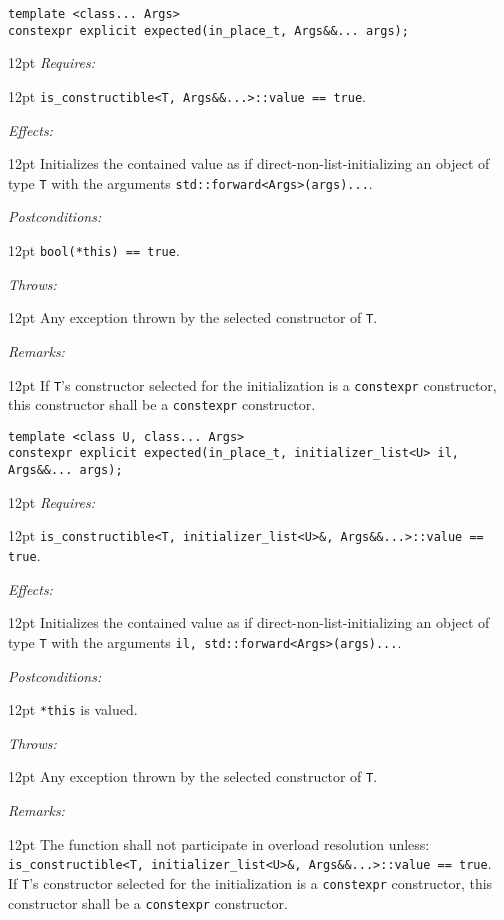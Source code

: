 \documentclass[a4paper,10pt]{article}
\newcommand{\cpp}[1]{\lstinline{#1}}
\newcommand{\wordingItem}[1]{\noindent\textit{#1:}}
\newenvironment{wordingTextItem}[1]{\wordingItem{#1}\vspace{7pt}\noindent\begin{adjustwidth}{12pt}{}}{\vspace{7pt}\end{adjustwidth}}
\newenvironment{wordingPara}{\begin{adjustwidth}{12pt}{}}{\end{adjustwidth}}
\begin{document}
\begin{lstlisting}[xleftmargin=0pt]
template <class... Args>
constexpr explicit expected(in_place_t, Args&&... args); 
\end{lstlisting}
\begin{wordingPara}
\begin{wordingTextItem}{Requires}
\cpp{is_constructible<T, Args&&...>::value == true}.
\end{wordingTextItem}
\begin{wordingTextItem}{Effects}
Initializes the contained value as if direct-non-list-initializing an object of type \cpp{T} with the arguments \cpp{std::forward<Args>(args)...}.
\end{wordingTextItem}
\begin{wordingTextItem}{Postconditions}
\cpp{bool(*this) == true}.
\end{wordingTextItem}
\begin{wordingTextItem}{Throws}
Any exception thrown by the selected constructor of \cpp{T}.
\end{wordingTextItem}
\begin{wordingTextItem}{Remarks}
If \cpp{T}'s constructor selected for the initialization is a \cpp{constexpr} constructor, this constructor shall be a \cpp{constexpr} constructor.
\end{wordingTextItem}
\end{wordingPara}

\begin{lstlisting}[xleftmargin=0pt]
template <class U, class... Args>
constexpr explicit expected(in_place_t, initializer_list<U> il, Args&&... args); 
\end{lstlisting}
\begin{wordingPara}
\begin{wordingTextItem}{Requires}
\cpp{is_constructible<T, initializer_list<U>&, Args&&...>::value == true}.
\end{wordingTextItem}
\begin{wordingTextItem}{Effects}
Initializes the contained value as if direct-non-list-initializing an object of type \cpp{T} with the arguments \cpp{il, std::forward<Args>(args)...}.
\end{wordingTextItem}
\begin{wordingTextItem}{Postconditions}
\cpp{*this} is valued.
\end{wordingTextItem}
\begin{wordingTextItem}{Throws}
Any exception thrown by the selected constructor of \cpp{T}.
\end{wordingTextItem}
\begin{wordingTextItem}{Remarks}
The function shall not participate in overload resolution unless:\\
\noindent
\cpp{is_constructible<T, initializer_list<U>&, Args&&...>::value == true}.\\

\noindent
If \cpp{T}'s constructor selected for the initialization is a \cpp{constexpr} constructor, this constructor shall be a \cpp{constexpr} constructor.
\end{wordingTextItem}
\end{wordingPara}
\end{document}
